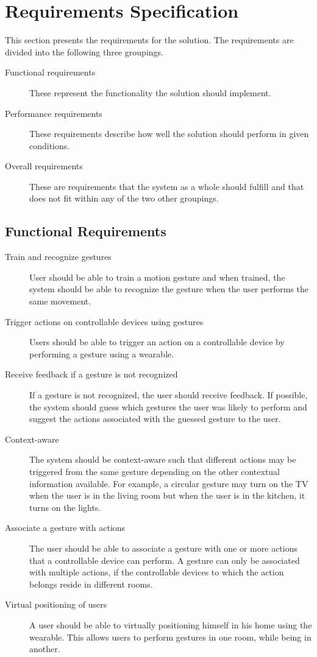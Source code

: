 \section{Requirements Specification}
\label{sec:requirements-specification}

This section presents the requirements for the solution. The requirements are divided into the following three groupings.

\begin{description}
\item[Functional requirements] These represent the functionality the solution should implement.
\item[Performance requirements] These requirements describe how well the solution should perform in given conditions.
\item[Overall requirements] These are requirements that the system as a whole should fulfill and that does not fit within any of the two other groupings.
\end{description}

\subsection{Functional Requirements}

\begin{description}
\item[Train and recognize gestures] User should be able to train a motion gesture and when trained, the system should be able to recognize the gesture when the user performs the same movement.
\item[Trigger actions on controllable devices using gestures] Users should be able to trigger an action on a controllable device by performing a gesture using a wearable.
\item[Receive feedback if a gesture is not recognized] If a gesture is not recognized, the user should receive feedback. If possible, the system should guess which gestures the user was likely to perform and suggest the actions associated with the guessed gesture to the user.
\item[Context-aware] The system should be context-aware such that different actions may be triggered from the same gesture depending on the other contextual information available. For example, a circular gesture may turn on the TV when the user is in the living room but when the user is in the kitchen, it turns on the lights.
\item[Associate a gesture with actions] The user should be able to associate a gesture with one or more actions that a controllable device can perform. A gesture can only be associated with multiple actions, if the controllable devices to which the action belongs reside in different rooms.
\item[Virtual positioning of users] A user should be able to virtually positioning himself in his home using the wearable. This allows users to perform gestures in one room, while being in another.
\end{description}

